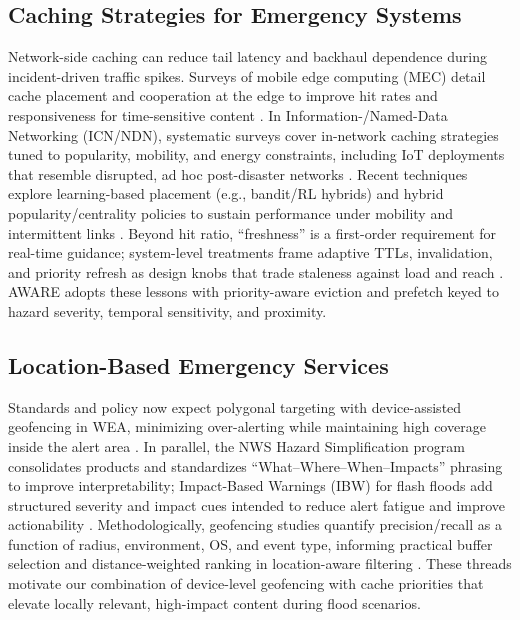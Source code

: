 \documentclass[11pt,twocolumn]{article}
\begin{document}
\subsection{Caching Strategies for Emergency Systems}
Network-side caching can reduce tail latency and backhaul dependence during incident-driven traffic spikes. Surveys of mobile edge computing (MEC) detail cache placement and cooperation at the edge to improve hit rates and responsiveness for time-sensitive content \cite{mec-caching-survey-2023}. In Information-/Named-Data Networking (ICN/NDN), systematic surveys cover in-network caching strategies tuned to popularity, mobility, and energy constraints, including IoT deployments that resemble disrupted, ad hoc post-disaster networks \cite{icn-iot-caching-survey-2023}. Recent techniques explore learning-based placement (e.g., bandit/RL hybrids) and hybrid popularity/centrality policies to sustain performance under mobility and intermittent links \cite{cache-mab-2023,electronics-2024-koide-icanet}. Beyond hit ratio, “freshness” is a first-order requirement for real-time guidance; system-level treatments frame adaptive TTLs, invalidation, and priority refresh as design knobs that trade staleness against load and reach \cite{hotnets-2024-freshness}. AWARE adopts these lessons with priority-aware eviction and prefetch keyed to hazard severity, temporal sensitivity, and proximity.

\subsection{Location-Based Emergency Services}
Standards and policy now expect polygonal targeting with device-assisted geofencing in WEA, minimizing over-alerting while maintaining high coverage inside the alert area \cite{fcc-2018-geo,fcc-wea-2023-doc,fema-wea-geo-2023,atis-0700041-summary}. In parallel, the NWS Hazard Simplification program consolidates products and standardizes “What–Where–When–Impacts” phrasing to improve interpretability; Impact-Based Warnings (IBW) for flash floods add structured severity and impact cues intended to reduce alert fatigue and improve actionability \cite{nws-hazsimp-2023,nws-ffwea}. Methodologically, geofencing studies quantify precision/recall as a function of radius, environment, OS, and event type, informing practical buffer selection and distance-weighted ranking in location-aware filtering \cite{shevchenko-2023-geofencing}. These threads motivate our combination of device-level geofencing with cache priorities that elevate locally relevant, high-impact content during flood scenarios.
\end{document}
